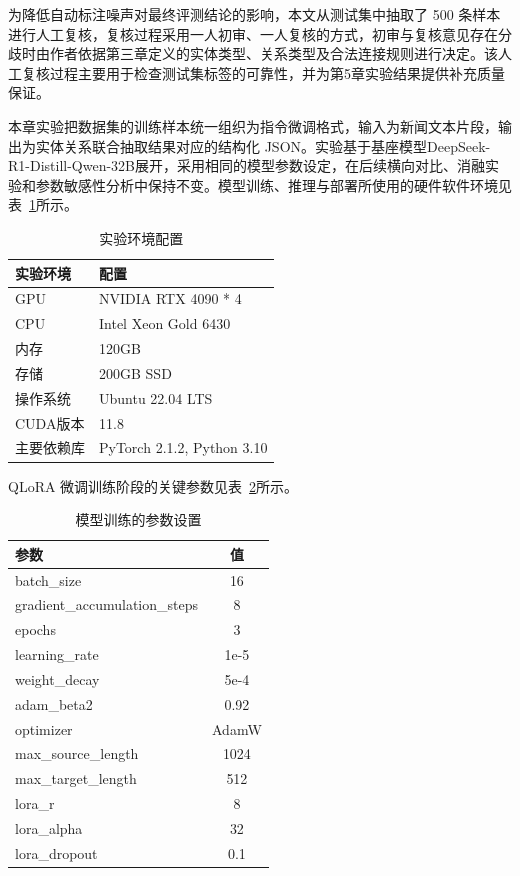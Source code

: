 为降低自动标注噪声对最终评测结论的影响，本文从测试集中抽取了 500 条样本进行人工复核，复核过程采用一人初审、一人复核的方式，初审与复核意见存在分歧时由作者依据第三章定义的实体类型、关系类型及合法连接规则进行决定。该人工复核过程主要用于检查测试集标签的可靠性，并为第5章实验结果提供补充质量保证。

本章实验把数据集的训练样本统一组织为指令微调格式，输入为新闻文本片段，输出为实体关系联合抽取结果对应的结构化 JSON。实验基于基座模型DeepSeek-R1-Distill-Qwen-32B展开，采用相同的模型参数设定，在后续横向对比、消融实验和参数敏感性分析中保持不变。模型训练、推理与部署所使用的硬件软件环境见表~\ref{tab:experiment_environment}所示。

\begin{table}[!htbp]
  \centering
  \caption{实验环境配置}
  \label{tab:experiment_environment}
  {
  \small
  \setlength{\tabcolsep}{10pt}
  \begin{tabular}{@{}ll@{}}
    \toprule
    实验环境 & 配置 \\
    \midrule
    GPU & NVIDIA RTX 4090 * 4\\
    CPU & Intel Xeon Gold 6430 \\
    内存 & 120GB \\
    存储 & 200GB SSD \\
    操作系统 & Ubuntu 22.04 LTS \\
    CUDA版本 & 11.8 \\
    主要依赖库 & PyTorch 2.1.2, Python 3.10 \\
    \bottomrule
  \end{tabular}}
\end{table}

\FloatBarrier

QLoRA 微调训练阶段的关键参数见表~\ref{tab:training_parameters}所示。

\begin{table}[!htbp]
  \centering
  \caption{模型训练的参数设置}
  \label{tab:training_parameters}
  {
  \small
  \setlength{\tabcolsep}{10pt}
  \begin{tabular}{@{}lc@{}}
    \toprule
    参数 & 值 \\
    \midrule
    batch\_size & 16 \\
    gradient\_accumulation\_steps & 8 \\
    epochs & 3 \\
    learning\_rate & 1e-5 \\
    weight\_decay & 5e-4 \\
    adam\_beta2 & 0.92 \\
    optimizer & AdamW \\
    max\_source\_length & 1024 \\
    max\_target\_length & 512 \\
    lora\_r & 8 \\
    lora\_alpha & 32 \\
    lora\_dropout & 0.1 \\
    \bottomrule
  \end{tabular}}
\end{table}

